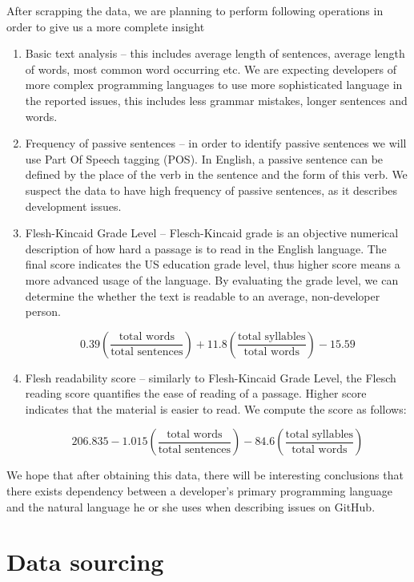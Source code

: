 \documentclass[]{article}
\begin{document}
After scrapping the data, we are planning to perform following operations in order to give us a more complete insight

\begin{enumerate}
    \item Basic text analysis -- this includes average length of sentences, average length of words, most common word occurring etc. We are expecting developers of more complex programming languages to use more sophisticated language in the reported issues, this includes less grammar mistakes, longer sentences and words.

    \item Frequency of passive sentences -- in order to identify passive sentences we will use Part Of Speech tagging (POS). In English, a passive sentence can be defined by the place of the verb in the sentence and the form of this verb. We suspect the data to have high frequency of passive sentences, as it describes development issues.

    \item Flesh-Kincaid Grade Level -- Flesch-Kincaid grade is an objective numerical description of how hard a passage is to read in the English language. The final score indicates the US education grade level, thus higher score means a more advanced usage of the language. By evaluating the grade level, we can determine the whether the text is readable to an average, non-developer person.

          \[0.39\left(\frac{\text{total words}}{\text{total sentences}}\right) + 11.8\left(\frac{\text{total syllables}}{\text{total words}}\right) - 15.59\]

    \item Flesh readability score -- similarly to Flesh-Kincaid Grade Level, the Flesch reading score quantifies the ease of reading of a passage. Higher score indicates that the material is easier to read. We compute the score as follows:

          \[206.835 - 1.015\left(\frac{\text{total words}}{\text{total sentences}}\right) - 84.6\left(\frac{\text{total syllables}}{\text{total words}}\right)\]
\end{enumerate}

We hope that after obtaining this data, there will be interesting conclusions that there exists dependency between a developer's primary programming language and the natural language he or she uses when describing issues on GitHub.

\section{Data sourcing}
\end{document}
